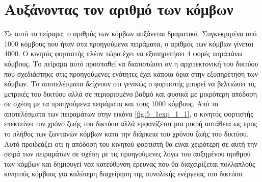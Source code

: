 \section{Αυξάνοντας τον αριθμό των κόμβων}\label{sc:result5}
Σε αυτό το πείραμα, ο αριθμός των κόμβων αυξάνεται δραματικά. Συγκεκριμένα από 1000 κόμβους που ήταν στα προηγούμενα πειράματα, ο αριθμός των κόμβων γίνεται 4000. Ο
κινητός φορτιστής πλέον τώρα έχει να εξυπηρετήσει 4 φορές παραπάνω κόμβους. Το πείραμα αυτό προσπαθεί να διαπιστώσει αν η αρχιτεκτονική του δικτύου που σχεδιάστηκε
στις προηγούμενες ενότητες έχει κάποια όρια στην εξυπηρέτηση των κόμβων. Τα αποτελέσματα δείχνουν οτι γενικώς ο φορτιστής μπορεί να βελτιώσει τις μετρικές του
δικτύου αλλά σε περιορισμένο βαθμό και φυσικά με μικρότερη απόδοση σε σχέση με τα προηγούμενα πειράματα και τους 1000 κόμβους. Από τα αποτελέσματα των πειραμάτων
στην εικόνα \ref{fig:5_1exp_1_1}, ο κινητός φορτιστής επεκτείνει τον χρόνο ζωής του δικτύου αλλά εμφανίζεται μια μικρή
αστάθεια ως προς το πλήθος των ζωντανών κόμβων κατα την διάρκεια του χρόνου ζωής του δικτύου. Αυτό προιδεάζει οτι η απόδοση του κινητού φορτιστή θα είναι χειρότερη
σε αυτή την σειρά των πειραμάτων σε σχέση με τις προηγούμενες λόγω του αυξημένου αριθμού των κόμβων και δημιουγεί νέα κατεύθυνση έρευνας που θα διαχειρίζεται
πολλαπλούς κινητούς κόμβους για καλύτερη διαχείρηση της συνολικής ενέργειας του δικτύου.

